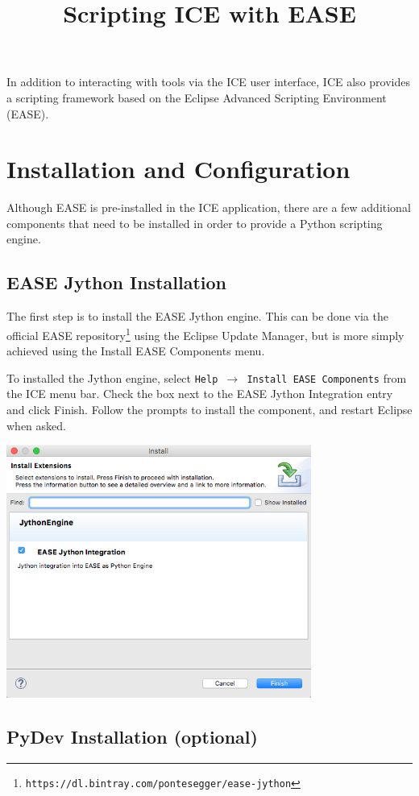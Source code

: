 \documentclass{article}
\begin{document}
\title{Scripting ICE with EASE}

In addition to interacting with tools via the ICE user interface, ICE also
provides a scripting framework based on the Eclipse Advanced Scripting
Environment (EASE). 

\section{Installation and Configuration}

Although EASE is pre-installed in the ICE application, there are a few
additional components that need to be installed in order to provide a Python
scripting engine.

\subsection{EASE Jython Installation} 

The first step is to install the EASE Jython engine. This can be done via the
official EASE
repository\footnote{\texttt{https://dl.bintray.com/pontesegger/ease-jython}}
using the Eclipse Update Manager, but is more simply achieved using the Install EASE Components menu.

To installed the Jython engine, select \texttt{Help $\rightarrow$ Install
EASE Components} from the ICE menu bar. Check the box next to the EASE Jython
Integration entry and click Finish. Follow the prompts to install the component,
and restart Eclipse when asked.

\begin{center}
\includegraphics[width=10cm]{images/ease-marketplace}
\end{center}

\subsection{PyDev Installation (optional)} 
\end{document}
